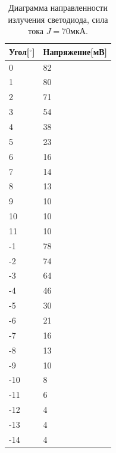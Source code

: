 \documentclass[a4paper, 12pt]{extarticle}
\begin{document}
    
\begin{table}
    \begin{center}
            

        \begin{tabular}{|l|l|}
            \hline
            Угол[$^{\circ}$]&Напряжение[мВ]\\
            \hline
            0&82\\
            1&80\\
            2&71\\
            3&54\\
            4&38\\
            5&23\\
            6&16\\
            7&14\\
            8&13\\
            9&10\\
            10&10\\
            11&10\\
            -1&78\\
            -2&74\\
            -3&64\\
            -4&46\\
            -5&30\\
            -6&21\\
            -7&16\\
            -8&13\\
            -9&10\\
            -10&8\\
            -11&6\\
            -12&4\\
            -13&4\\
            -14&4\\
            \hline
        \end{tabular}

    \end{center}
    \caption{Диаграмма направленности излучения светодиода, сила тока $J = 70\text{мкА}$.}
    \label{tab:diode}
\end{table}
    
    
    
\end{document}
